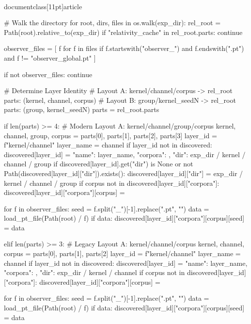 \\documentclass[11pt]{article}
\begin{document}
\begin{CodeBlock}
    # Walk the directory
    for root, dirs, files in os.walk(exp_dir):
        rel_root = Path(root).relative_to(exp_dir)
        if "relativity_cache" in rel_root.parts:
            continue

        observer_files = [
            f
            for f in files
            if f.startswith("observer_") and f.endswith(".pt") and f != "observer_global.pt"
        ]
        
        if not observer_files:
            continue
            
        # Determine Layer Identity
        # Layout A: kernel/channel/corpus -> rel_root parts: (kernel, channel, corpus)
        # Layout B: group/kernel_seedN -> rel_root parts: (group, kernel_seedN)
        parts = rel_root.parts
        
        if len(parts) >= 4:
            # Modern Layout A: kernel/channel/group/corpus
            kernel, channel, group, corpus = parts[0], parts[1], parts[2], parts[3]
            layer_id = f"{kernel}/{channel}"
            layer_name = channel
            if layer_id not in discovered:
                discovered[layer_id] = {"name": layer_name, "corpora": {}, "dir": exp_dir / kernel / channel / group}
            if discovered[layer_id].get("dir") is None or not Path(discovered[layer_id]["dir"]).exists():
                discovered[layer_id]["dir"] = exp_dir / kernel / channel / group
            if corpus not in discovered[layer_id]["corpora"]:
                discovered[layer_id]["corpora"][corpus] = {}

            for f in observer_files:
                seed = f.split("_")[-1].replace(".pt", "")
                data = load_pt_file(Path(root) / f)
                if data:
                    discovered[layer_id]["corpora"][corpus][seed] = data

        elif len(parts) >= 3:
            # Legacy Layout A: kernel/channel/corpus
            kernel, channel, corpus = parts[0], parts[1], parts[2]
            layer_id = f"{kernel}/{channel}"
            layer_name = channel
            if layer_id not in discovered: discovered[layer_id] = {"name": layer_name, "corpora": {}, "dir": exp_dir / kernel / channel}
            if corpus not in discovered[layer_id]["corpora"]: discovered[layer_id]["corpora"][corpus] = {}
            
            for f in observer_files:
                seed = f.split("_")[-1].replace(".pt", "")
                data = load_pt_file(Path(root) / f)
                if data: discovered[layer_id]["corpora"][corpus][seed] = data
                

\end{CodeBlock}
\end{document}
